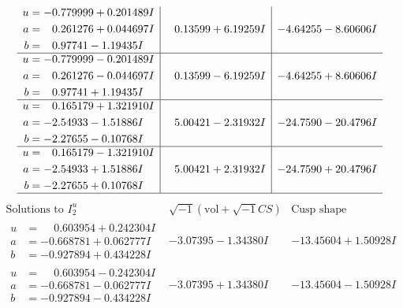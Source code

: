 \documentclass[1p]{elsarticle_modified}
\theoremstyle{definition}
\newcommand{\I}{\sqrt{-1}}
\begin{document}
$$\begin{array}{c|c|c}
\begin{aligned}
u &= -0.779999 + 0.201489 I \\
a &= \phantom{-}0.261276 + 0.044697 I \\
b &= \phantom{-}0.97741 - 1.19435 I\end{aligned}
 & \phantom{-}0.13599 + 6.19259 I & -4.64255 - 8.60606 I \\ \hline\begin{aligned}
u &= -0.779999 - 0.201489 I \\
a &= \phantom{-}0.261276 - 0.044697 I \\
b &= \phantom{-}0.97741 + 1.19435 I\end{aligned}
 & \phantom{-}0.13599 - 6.19259 I & -4.64255 + 8.60606 I \\ \hline\begin{aligned}
u &= \phantom{-}0.165179 + 1.321910 I \\
a &= -2.54933 - 1.51886 I \\
b &= -2.27655 - 0.10768 I\end{aligned}
 & \phantom{-}5.00421 - 2.31932 I & -24.7590 - 20.4796 I \\ \hline\begin{aligned}
u &= \phantom{-}0.165179 - 1.321910 I \\
a &= -2.54933 + 1.51886 I \\
b &= -2.27655 + 0.10768 I\end{aligned}
 & \phantom{-}5.00421 + 2.31932 I & -24.7590 + 20.4796 I\\
 \hline 
 \end{array}$$\newpage$$\begin{array}{c|c|c}  
\text{Solutions to }I^u_{2}& \I (\text{vol} + \sqrt{-1}CS) & \text{Cusp shape}\\
 \hline 
\begin{aligned}
u &= \phantom{-}0.603954 + 0.242304 I \\
a &= -0.668781 + 0.062777 I \\
b &= -0.927894 + 0.434228 I\end{aligned}
 & -3.07395 - 1.34380 I & -13.45604 + 1.50928 I \\ \hline\begin{aligned}
u &= \phantom{-}0.603954 - 0.242304 I \\
a &= -0.668781 - 0.062777 I \\
b &= -0.927894 - 0.434228 I\end{aligned}
 & -3.07395 + 1.34380 I & -13.45604 - 1.50928 I \\ \hline\begin{aligned}

\end{aligned}
\end{array}$$
\end{document}
